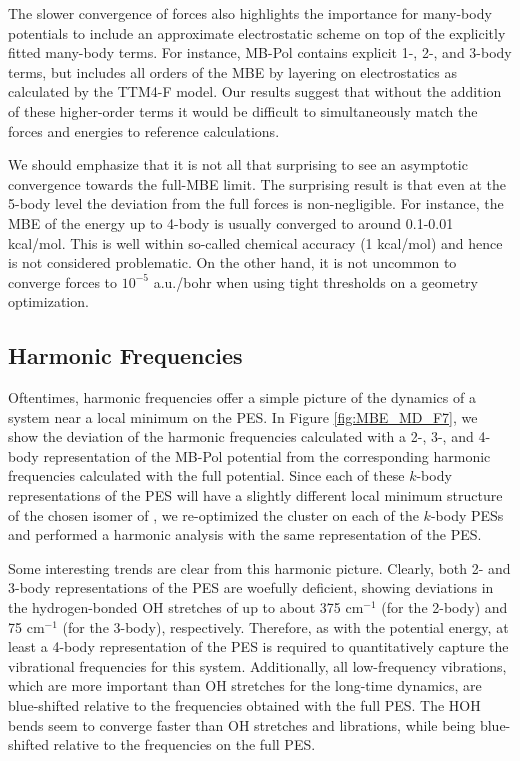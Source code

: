 \documentclass[11pt, proquest]{uwthesis}[2020/02/24]
\let\ce\ch
\begin{document}
\par The slower convergence of forces also highlights the importance for many-body potentials to include an approximate electrostatic scheme on top of the explicitly fitted many-body terms. For instance, MB-Pol contains explicit 1-, 2-, and 3-body terms, but includes all orders of the MBE by layering on electrostatics as calculated by the TTM4-F model.\autocite{burnham_vibrational_2008} Our results suggest that without the addition of these higher-order terms it would be difficult to simultaneously match the forces and energies to reference calculations.

\par We should emphasize that it is not all that surprising to see an asymptotic convergence towards the full-MBE limit. The surprising result is that even at the 5-body level the deviation from the full forces is non-negligible. For instance, the MBE of the energy up to 4-body is usually converged to around 0.1-0.01 kcal/mol. This is well within so-called chemical accuracy (1 kcal/mol) and hence is not considered problematic. On the other hand, it is not uncommon to converge forces to $10^{-5}$ a.u./bohr when using tight thresholds on a geometry optimization. 

\subsection{Harmonic Frequencies}

\par Oftentimes, harmonic frequencies offer a simple picture of the dynamics of a system near a local minimum on the PES. In Figure \ref{fig:MBE_MD_F7}, we show the deviation of the harmonic frequencies calculated with a 2-, 3-, and 4-body representation of the MB-Pol potential from the corresponding harmonic frequencies calculated with the full potential. Since each of these $k$-body representations of the PES will have a slightly different local minimum structure of the chosen isomer of \ce{(H2O)_{10}}, we re-optimized the cluster on each of the $k$-body PESs and performed a harmonic analysis with the same representation of the PES.



\par Some interesting trends are clear from this harmonic picture. Clearly, both 2- and 3-body representations of the PES are woefully deficient, showing deviations in the hydrogen-bonded OH stretches of up to about 375 $\mathrm{cm}^{-1}$ (for the 2-body) and 75 $\mathrm{cm}^{-1}$ (for the 3-body), respectively. Therefore, as with the potential energy, at least a 4-body representation of the PES is required to quantitatively capture the vibrational frequencies for this system. Additionally, all low-frequency vibrations, which are more important than OH stretches for the long-time dynamics, are blue-shifted relative to the frequencies obtained with the full PES. The HOH bends seem to converge faster than OH stretches and librations, while being blue-shifted relative to the frequencies on the full PES.
\end{document}
